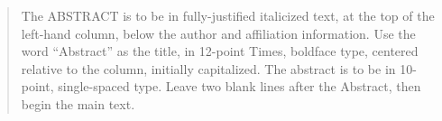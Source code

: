 \begin{abstract}
   The ABSTRACT is to be in fully-justified italicized text, at the top
   of the left-hand column, below the author and affiliation
   information. Use the word ``Abstract'' as the title, in 12-point
   Times, boldface type, centered relative to the column, initially
   capitalized. The abstract is to be in 10-point, single-spaced type.
   Leave two blank lines after the Abstract, then begin the main text.
\end{abstract}